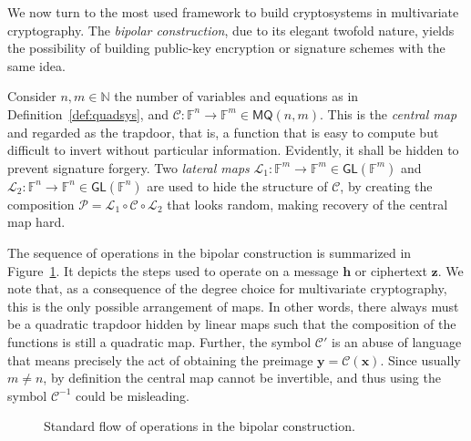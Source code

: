 \documentclass[draft, 12pt, a4paper, oneside]{memoir}
\theoremstyle{definition}
\begin{document}
We now turn to the most used framework to build cryptosystems in multivariate cryptography. The \emph{bipolar construction}, due to its elegant twofold nature, yields the possibility of building public-key encryption or signature schemes with the same idea.

Consider $n, m \in \mathbb{N}$ the number of variables and equations as in Definition~\ref{def:quadsys}, and $\mathcal{C} : \mathbb{F}^{n} \to \mathbb{F}^{m} \in \mathsf{MQ}(n, m)$. This is the \emph{central map} and regarded as the trapdoor, that is, a function that is easy to compute but difficult to invert without particular information. Evidently, it shall be hidden to prevent signature forgery. Two \emph{lateral maps} $\mathcal{L}_{1} : \mathbb{F}^{m} \to \mathbb{F}^{m} \in \mathsf{GL}(\mathbb{F}^{m})$ and $\mathcal{L}_{2} : \mathbb{F}^{n} \to \mathbb{F}^{n} \in \mathsf{GL}(\mathbb{F}^{n})$ are used to hide the structure of $\mathcal{C}$, by creating the composition $\mathcal{P} = \mathcal{L}_{1} \circ \mathcal{C} \circ \mathcal{L}_{2}$ that looks random, making recovery of the central map hard. 

The sequence of operations in the bipolar construction is summarized in Figure~\ref{fig:bipolar}. It depicts the steps used to operate on a message $\mathbf{h}$ or ciphertext $\mathbf{z}$. We note that, as a consequence of the degree choice for multivariate cryptography, this is the only possible arrangement of maps. In other words, there always must be a quadratic trapdoor hidden by linear maps such that the composition of the functions is still a quadratic map. Further, the symbol $\mathcal{C}'$ is an abuse of language that means precisely the act of obtaining the preimage $\mathbf{y} = \mathcal{C}(\mathbf{x})$. Since usually $m \neq n$, by definition the central map cannot be invertible, and thus using the symbol $\mathcal{C}^{-1}$ could be misleading.

\begin{figure}[htbp]
  \centering
  \caption{Standard flow of operations in the bipolar
    construction.}\label{fig:bipolar}
\end{figure}
\end{document}
